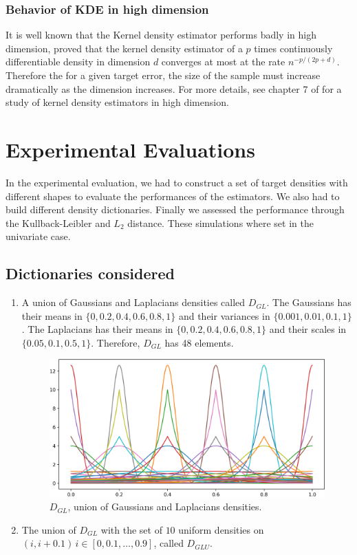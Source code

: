 \subsubsection{Behavior of KDE in high dimension}
It is well known that the Kernel density estimator performs badly in high dimension, \citep{stone1980} proved that the kernel density estimator of a $p$ times continuously differentiable density in dimension $d$ converges at most at the rate $n^{-p/(2p+d)}$. Therefore the for a given target error, the size of the sample must increase dramatically as the dimension increases. For more details, see chapter 7 of \citep{scott_multivariate_2015} for a study of kernel density estimators in high dimension. 

\section{Experimental Evaluations}

In the experimental evaluation, we had to construct a set of target densities with different shapes to evaluate the performances of the estimators. We also had to build different density dictionaries. Finally we assessed the performance through the Kullback-Leibler and $L_2$ distance. These simulations where set in the univariate case.

\subsection{Dictionaries considered}
\begin{enumerate}
\item A union of Gaussians and Laplacians densities called $D_{GL}$. The Gaussians has their means in $\{0, 0.2, 0.4, 0.6, 0.8, 1\}$ and their variances in $\{0.001, 0.01, 0.1, 1\}$. The Laplacians has their means in $\{0, 0.2, 0.4, 0.6, 0.8, 1\}$ and their scales in $\{0.05, 0.1, 0.5, 1\}$. Therefore, $D_{GL}$ has 48 elements.

\begin{figure}[h]
\centering
\includegraphics[width=1\textwidth]{TeX_files/lapl_gauss_dict.png}
\caption{$D_{GL}$, union of Gaussians and Laplacians densities.}
\end{figure}
\item The union of $D_{GL}$ with the set of $10$ uniform densities on $(i, i+0.1)\, i\in [0, 0.1,\dots,0.9]$, called $D_{GLU}$.
\end{enumerate}

